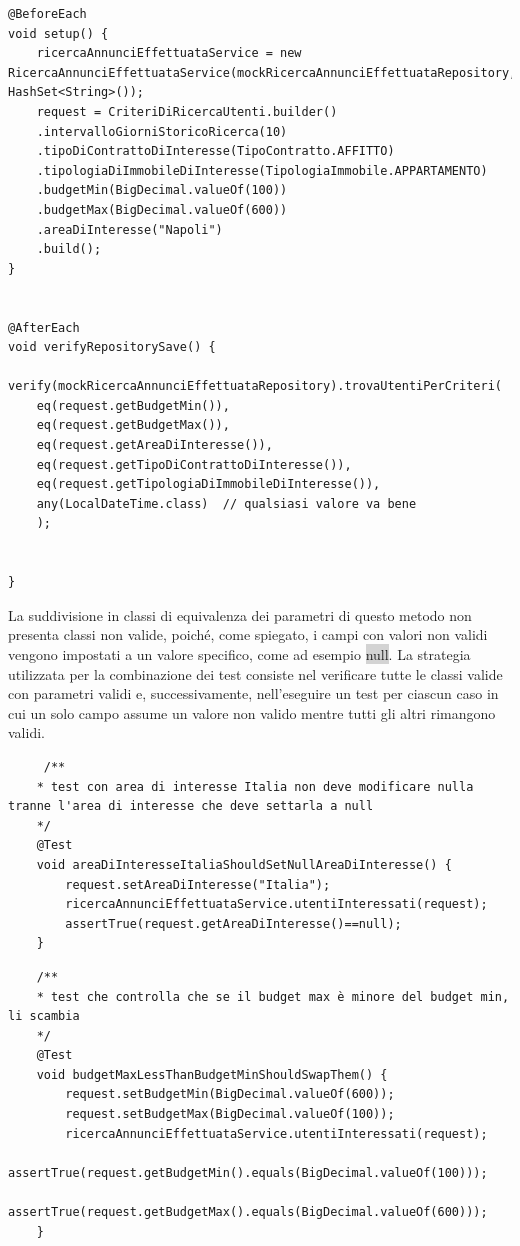 \begin{lstlisting}
@BeforeEach 
void setup() {
	ricercaAnnunciEffettuataService = new RicercaAnnunciEffettuataService(mockRicercaAnnunciEffettuataRepository,MockUserRepository,new HashSet<String>());
	request = CriteriDiRicercaUtenti.builder()
	.intervalloGiorniStoricoRicerca(10)
	.tipoDiContrattoDiInteresse(TipoContratto.AFFITTO)
	.tipologiaDiImmobileDiInteresse(TipologiaImmobile.APPARTAMENTO)
	.budgetMin(BigDecimal.valueOf(100))
	.budgetMax(BigDecimal.valueOf(600))
	.areaDiInteresse("Napoli")
	.build();
}


@AfterEach 
void verifyRepositorySave() {
	verify(mockRicercaAnnunciEffettuataRepository).trovaUtentiPerCriteri(
	eq(request.getBudgetMin()),
	eq(request.getBudgetMax()),
	eq(request.getAreaDiInteresse()),
	eq(request.getTipoDiContrattoDiInteresse()),
	eq(request.getTipologiaDiImmobileDiInteresse()),
	any(LocalDateTime.class)  // qualsiasi valore va bene
	);
	
	
}
\end{lstlisting}

La suddivisione in classi di equivalenza dei parametri di questo metodo non presenta classi non valide, poiché, come spiegato, i campi con valori non validi vengono impostati a un valore specifico, come ad esempio \colorbox{lightgray}{null}.
La strategia utilizzata per la combinazione dei test consiste nel verificare tutte le classi valide con parametri validi e, successivamente, nell’eseguire un test per ciascun caso in cui un solo campo assume un valore non valido mentre tutti gli altri rimangono validi.


\begin{lstlisting}
	 /**
	* test con area di interesse Italia non deve modificare nulla tranne l'area di interesse che deve settarla a null
	*/
	@Test
	void areaDiInteresseItaliaShouldSetNullAreaDiInteresse() {
		request.setAreaDiInteresse("Italia");
		ricercaAnnunciEffettuataService.utentiInteressati(request);
		assertTrue(request.getAreaDiInteresse()==null);
	}
\end{lstlisting}

\begin{lstlisting}
	/**
	* test che controlla che se il budget max è minore del budget min, li scambia
	*/
	@Test
	void budgetMaxLessThanBudgetMinShouldSwapThem() {
		request.setBudgetMin(BigDecimal.valueOf(600));
		request.setBudgetMax(BigDecimal.valueOf(100));
		ricercaAnnunciEffettuataService.utentiInteressati(request);
		assertTrue(request.getBudgetMin().equals(BigDecimal.valueOf(100)));
		assertTrue(request.getBudgetMax().equals(BigDecimal.valueOf(600)));
	}
\end{lstlisting}

